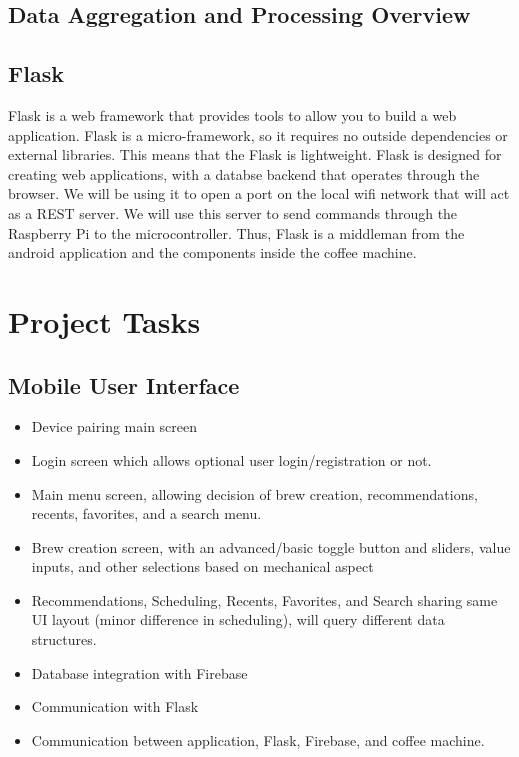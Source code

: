 \documentclass[conference]{IEEEtran}
\begin{document}
\subsection{Data Aggregation and Processing Overview}

\subsection{Flask}
Flask is a web framework that provides tools to allow you to build a web application.
Flask is a micro-framework, so it requires no outside dependencies or external libraries.
This means that the Flask is lightweight. Flask is designed for creating web applications,
with a databse backend that operates through the browser. We will be using it to open
a port on the local wifi network that will act as a REST server. We will use this server to send
commands through the Raspberry Pi to the microcontroller. Thus, Flask is a middleman from the 
android application and the components inside the coffee machine.

\section{Project Tasks}
\subsection{Mobile User Interface}
\begin{itemize}
  \item Device pairing main screen
  \item Login screen which allows optional user login/registration or not.
  \item Main menu screen, allowing decision of brew creation, recommendations, recents, favorites, and a search menu.
  \item Brew creation screen, with an advanced/basic toggle button and sliders, value inputs, and other selections based on mechanical aspect
  \item Recommendations, Scheduling, Recents, Favorites, and Search sharing same UI layout (minor difference in scheduling), will query different data structures.
  \item Database integration with Firebase
  \item Communication with Flask
  \item Communication between application, Flask, Firebase, and coffee machine.
\end{itemize}
\end{document}
